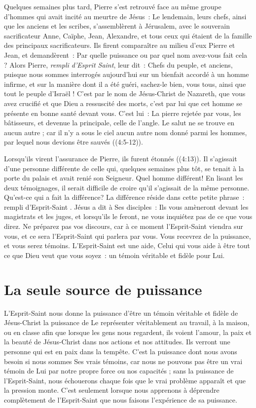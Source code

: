 Quelques semaines plus tard, Pierre s'est retrouvé face au même groupe
 d'hommes qui avait incité au meurtre de Jésus~:
 \og Le lendemain, leurs chefs, ainsi que les anciens et les scribes,
 s'assemblèrent à Jérusalem, avec le souverain sacrificateur Anne,
 Caïphe, Jean, Alexandre, et tous ceux qui étaient de la famille
 des principaux sacrificateurs. Ils firent comparaître au milieu d'eux
 Pierre et Jean, et demandèrent~: Par quelle puissance ou par quel nom
 avez-vous fait cela ? Alors Pierre, \emph{rempli d'Esprit Saint}, leur dit~:
 Chefs du peuple, et anciens, puisque nous sommes interrogés aujourd'hui
 sur un bienfait accordé à un homme infirme, et sur la manière
 dont il a été guéri, sachez-le bien, vous tous, ainsi que tout le peuple
 d'Israël ! C'est par le nom de Jésus-Christ de Nazareth, que vous avez
 crucifié et que Dieu a ressuscité des morts, c'est par lui que cet homme
 se présente en bonne santé devant vous. C'est lui~: La pierre rejetée
 par vous, les bâtisseurs, et devenue la principale, celle de l'angle.
 Le salut ne se trouve en aucun autre ; car il n'y a sous le ciel aucun
 autre nom donné parmi les hommes, par lequel nous devions être
 sauvés \fg{} ((4:5-12)).

Lorsqu'ils virent l'assurance de Pierre, ils furent étonnés
 ((4:13)). Il s'agissait d'une personne différente
 de celle qui, quelques semaines plus tôt, se tenait à la porte du palais
 et avait renié son Seigneur. Quel homme différent!
 En lisant les deux témoignages, il serait difficile de croire
 qu'il s'agissait de la même personne. Qu'est-ce qui a fait la différence?
 La différence réside dans cette petite phrase~:
 \og rempli d'Esprit-Saint \fg{}. Jésus a dit à Ses disciples~:
 \og Ils vous amèneront devant les magistrats et les juges,
 et lorsqu'ils le feront, ne vous inquiétez pas de ce que vous direz.
 Ne préparez pas vos discours, car à ce moment l'Esprit-Saint viendra
 sur vous, et ce sera l'Esprit-Saint qui parlera par vous.
 Vous recevrez de la puissance, et vous serez témoins. \fg{}
 L'Esprit-Saint est une aide, Celui qui vous aide à être tout ce que Dieu
 veut que vous soyez~: un témoin véritable et fidèle pour Lui.


\section*{La seule source de puissance}

L'Esprit-Saint nous donne la puissance d'être un témoin véritable
 et fidèle de Jésus-Christ \ocadr la puissance de Le représenter
 véritablement au travail, à la maison, ou en classe \fcadr{}
 afin que lorsque les gens nous regardent, ils voient l'amour,
 la paix et la beauté de Jésus-Christ dans nos actions et nos attitudes.
 Ils verront une personne qui est en paix dans la tempête.
 C'est la puissance dont nous avons besoin si nous sommes Ses vrais témoins,
 car nous ne pouvons pas être un vrai témoin de Lui par notre propre force
 ou nos capacités ; sans la puissance de l'Esprit-Saint, nous échouerons
 chaque fois que le vrai problème apparaît et que la pression monte.
 C'est seulement lorsque nous apprenons à déprendre complètement
 de l'Esprit-Saint que nous faisons l'expérience de sa puissance.

